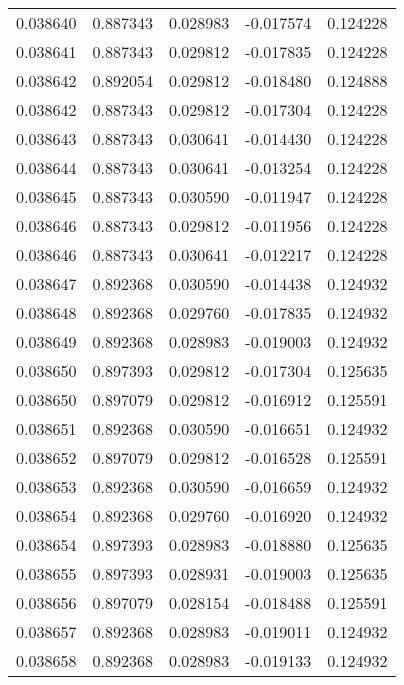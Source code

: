 \begin{tabular}{lrrrr}
0.038640    &  0.887343 &  0.028983 & -0.017574 &             0.124228 \\
0.038641    &  0.887343 &  0.029812 & -0.017835 &             0.124228 \\
0.038642    &  0.892054 &  0.029812 & -0.018480 &             0.124888 \\
0.038642    &  0.887343 &  0.029812 & -0.017304 &             0.124228 \\
0.038643    &  0.887343 &  0.030641 & -0.014430 &             0.124228 \\
0.038644    &  0.887343 &  0.030641 & -0.013254 &             0.124228 \\
0.038645    &  0.887343 &  0.030590 & -0.011947 &             0.124228 \\
0.038646    &  0.887343 &  0.029812 & -0.011956 &             0.124228 \\
0.038646    &  0.887343 &  0.030641 & -0.012217 &             0.124228 \\
0.038647    &  0.892368 &  0.030590 & -0.014438 &             0.124932 \\
0.038648    &  0.892368 &  0.029760 & -0.017835 &             0.124932 \\
0.038649    &  0.892368 &  0.028983 & -0.019003 &             0.124932 \\
0.038650    &  0.897393 &  0.029812 & -0.017304 &             0.125635 \\
0.038650    &  0.897079 &  0.029812 & -0.016912 &             0.125591 \\
0.038651    &  0.892368 &  0.030590 & -0.016651 &             0.124932 \\
0.038652    &  0.897079 &  0.029812 & -0.016528 &             0.125591 \\
0.038653    &  0.892368 &  0.030590 & -0.016659 &             0.124932 \\
0.038654    &  0.892368 &  0.029760 & -0.016920 &             0.124932 \\
0.038654    &  0.897393 &  0.028983 & -0.018880 &             0.125635 \\
0.038655    &  0.897393 &  0.028931 & -0.019003 &             0.125635 \\
0.038656    &  0.897079 &  0.028154 & -0.018488 &             0.125591 \\
0.038657    &  0.892368 &  0.028983 & -0.019011 &             0.124932 \\
0.038658    &  0.892368 &  0.028983 & -0.019133 &             0.124932 \\

\end{tabular}
